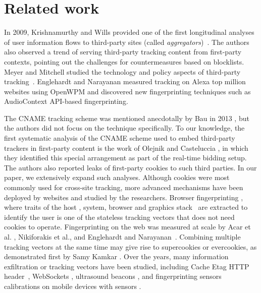 \section{Related work}


In 2009, Krishnamurthy and Wills provided one of the first longitudinal analyses of user information flows to third-party sites (called \textit{aggregators})~\cite{krishnamurthy2009privacy}.
The authors also observed a trend of serving third-party tracking content from first-party contexts, pointing out the challenges for countermeasures based on blocklists.
Meyer and Mitchell studied the technology and policy aspects of third-party tracking~\cite{mayer2012third}. Englehardt and Narayanan \cite{englehardt2016online} 
measured tracking on Alexa top million websites using OpenWPM and discovered new fingerprinting techniques such as AudioContext API-based fingerprinting.

The CNAME tracking scheme was mentioned anecdotally by Bau in 2013 \cite{bau2013promising}, but the authors did not focus on the technique specifically.
To our knowledge, the first systematic analysis of the CNAME scheme used to embed third-party trackers in first-party content is the work of Olejnik and Casteluccia \cite{olejnik2014analysis}, 
in which they identified this special arrangement as part of the real-time bidding setup.
The authors also reported leaks of first-party cookies to such third parties. In our paper, we extensively expand such analyses.
Although cookies were most commonly used for cross-site tracking, more advanced mechanisms have been deployed by websites and studied by the researchers. Browser fingerprinting \cite{eckersley2010unique}, where traits of the host \cite{yen2012host}, system, browser and graphics stack~\cite{mowery2012pixel} are extracted to identify the user is one of the stateless tracking vectors that does not need cookies to operate.
Fingerprinting on the web was measured at scale by Acar et al. \cite{acar2013fpdetective, Acar:2014:WNF:2660267.2660347}, Nikiforakis et al.\cite{nikiforakis2013cookieless},
and Englehardt and Narayanan~\cite{englehardt2016online}. Combining multiple tracking vectors at the same time may give rise to supercookies or evercookies, as demonstrated first by Samy Kamkar \cite{kamkar2010evercookie}.
Over the years, many information exfiltration or tracking vectors have been studied, including Cache Etag HTTP header~\cite{ayenson2011flash}, WebSockets \cite{bashir2018tracking}, ultrasound beacons \cite{mavroudis2017privacy}, and fingerprinting sensors calibrations on mobile devices with sensors \cite{zhang2019sensorid}. 
 

